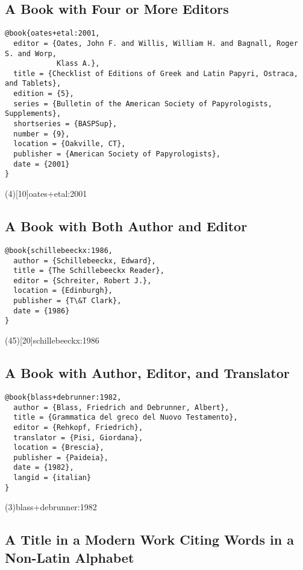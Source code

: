 \documentclass[a4paper]{article}
\begin{document}
\subsection{A Book with Four or More Editors}

\begin{verbatim}
@book{oates+etal:2001,
  editor = {Oates, John F. and Willis, William H. and Bagnall, Roger S. and Worp,
            Klass A.},
  title = {Checklist of Editions of Greek and Latin Papyri, Ostraca, and Tablets},
  edition = {5},
  series = {Bulletin of the American Society of Papyrologists, Supplements},
  shortseries = {BASPSup},
  number = {9},
  location = {Oakville, CT},
  publisher = {American Society of Papyrologists},
  date = {2001}
}
\end{verbatim}

\examplecite(4)[10]{oates+etal:2001}
\exampleabbreviations
\examplebibliography

\subsection{A Book with Both Author and Editor}

\begin{verbatim}
@book{schillebeeckx:1986,
  author = {Schillebeeckx, Edward},
  title = {The Schillebeeckx Reader},
  editor = {Schreiter, Robert J.},
  location = {Edinburgh},
  publisher = {T\&T Clark},
  date = {1986}
}
\end{verbatim}

\examplecite(45)[20]{schillebeeckx:1986}
\examplebibliography

\subsection{A Book with Author, Editor, and Translator}

\begin{verbatim}
@book{blass+debrunner:1982,
  author = {Blass, Friedrich and Debrunner, Albert},
  title = {Grammatica del greco del Nuovo Testamento},
  editor = {Rehkopf, Friedrich},
  translator = {Pisi, Giordana},
  location = {Brescia},
  publisher = {Paideia},
  date = {1982},
  langid = {italian}
}
\end{verbatim}

\examplecite(3){blass+debrunner:1982}
\examplebibliography

\subsection{A Title in a Modern Work Citing Words in a Non-Latin Alphabet}
\end{document}
